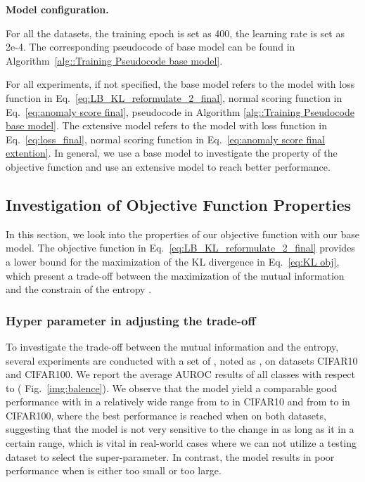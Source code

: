 \documentclass[journal]{IEEEtran}
\theoremstyle{remark}
\begin{document}
\textbf{Model configuration.} 

For all the datasets, the training epoch is set as 400, the learning rate is set as 2e-4. 
The corresponding pseudocode of base model can be found in Algorithm~\ref{alg::Training Pseudocode base model}.

For all experiments, if not specified, the base model refers to the model with loss function in Eq.~\ref{eq:LB_KL_reformulate_2_final}, normal scoring function in Eq.~\ref{eq:anomaly score final}, pseudocode in Algorithm \ref{alg::Training Pseudocode base model}. The extensive model refers to the model with loss function in Eq.~\ref{eq:loss_final}, normal scoring function in Eq.~\ref{eq:anomaly score final extention}. In general, we use a base model to investigate the property of the objective function and use an extensive model to reach better performance.


\subsection{Investigation of Objective Function Properties}\label{sec:Property}
In this section, we look into the properties of our objective function with our base model. 
The objective function in Eq.~\ref{eq:LB_KL_reformulate_2_final} provides a lower bound for the maximization of the KL divergence in Eq.~\ref{eq:KL obj}, which present a trade-off between the maximization of the mutual information  and the constrain of the entropy .

\subsubsection{\textbf{Hyper parameter  in adjusting the trade-off}}\label{sec:balance}
To investigate the trade-off between the mutual information and the entropy, several experiments are conducted with a set of  , noted as , on datasets CIFAR10 and CIFAR100. We report the average AUROC results of all classes with respect to  ( Fig.~\ref{img:balence}).
We observe that the model yield a comparable good performance with  in a relatively wide range from  to  in CIFAR10 and from  to  in CIFAR100, where the best performance is reached when  on both datasets, suggesting that the model is not very sensitive to the change in  as long as it in a certain range, which is vital in real-world cases where we can not utilize a testing dataset to select the super-parameter. In contrast, the model results in poor performance when  is either too small or too large.
\end{document}
